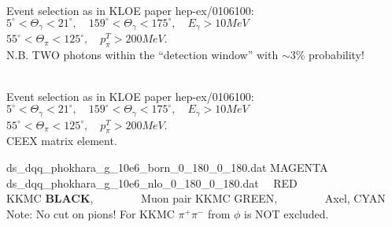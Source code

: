 \documentclass[dvips]{seminar}                      %
\begin{document}
\begin{slide}
\vspace{-3mm}
\\
Event selection as in KLOE paper hep-ex/0106100:\\
$ 5^\circ <\Theta_\gamma< 21^\circ,\quad  159^\circ <\Theta_\gamma< 175^\circ,\quad E_\gamma>10MeV $\\
$ 55^\circ <\Theta_\pi< 125^\circ,\quad p_\pi^T>200MeV$.\\
N.B. TWO photons within the ``detection window'' with $\sim 3\%$ probability!
\vfill
\end{slide}    %


\begin{slide}
\vspace{-3mm}
\\
Event selection as in KLOE paper hep-ex/0106100:\\
$ 5^\circ <\Theta_\gamma< 21^\circ,\quad  159^\circ <\Theta_\gamma< 175^\circ,\quad E_\gamma>10MeV $\\
$ 55^\circ <\Theta_\pi< 125^\circ,\quad p_\pi^T>200MeV$.\\
CEEX  matrix element.
\vfill
\end{slide}    %


\begin{slide}
\vspace{-3mm}
{\footnotesize
{}
  ds\_dqq\_phokhara\_g\_10e6\_born\_0\_180\_0\_180.dat {\cmg MAGENTA} \\
  ds\_dqq\_phokhara\_g\_10e6\_nlo\_0\_180\_0\_180.dat~~  {\red RED} \\
  KKMC {\bf BLACK}, ~~~~~~~~Muon pair KKMC {\cgr GREEN}, ~~~~~~~~Axel, CYAN\\
  Note:  No cut on pions! For KKMC $\pi^+\pi^-$ from $\phi$ is NOT excluded.
}
\vfill
\end{slide}    %
\end{document}
